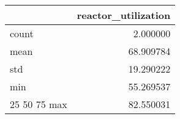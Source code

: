 \begin{tabular}{lr}
\toprule
 & reactor\_utilization \\
\midrule
count & 2.000000 \\
mean & 68.909784 \\
std & 19.290222 \\
min & 55.269537 \\
25%
50%
75%
max & 82.550031 \\
\bottomrule
\end{tabular}

